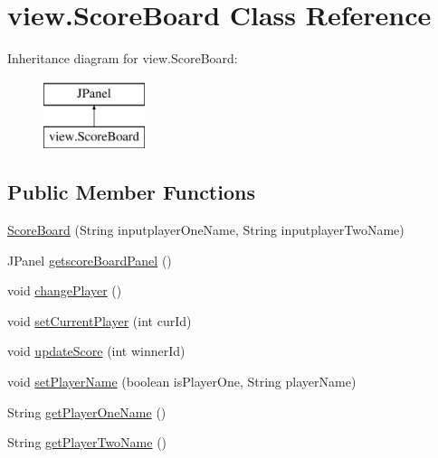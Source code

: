 \hypertarget{classview_1_1_score_board}{}\section{view.\+Score\+Board Class Reference}
\label{classview_1_1_score_board}
Inheritance diagram for view.\+Score\+Board\+:\begin{figure}[H]
\begin{center}
\leavevmode
\includegraphics[height=2.000000cm]{classview_1_1_score_board}
\end{center}
\end{figure}
\subsection*{Public Member Functions}
\begin{DoxyCompactItemize}
\item 
\mbox{\hyperlink{classview_1_1_score_board_ad9bcca8602465dc9c33b93053353a4fa}{Score\+Board}} (String inputplayer\+One\+Name, String inputplayer\+Two\+Name)
\item 
J\+Panel \mbox{\hyperlink{classview_1_1_score_board_a138c5f04adeea67eebffb3fa1bd8a555}{getscore\+Board\+Panel}} ()
\item 
void \mbox{\hyperlink{classview_1_1_score_board_a0a8523b0eb173040e140bbaa50c88a6c}{change\+Player}} ()
\item 
void \mbox{\hyperlink{classview_1_1_score_board_a2e37f0bda468fefb721e2619c736546f}{set\+Current\+Player}} (int cur\+Id)
\item 
void \mbox{\hyperlink{classview_1_1_score_board_ab2ce69c0f2a069520648b51dacb00949}{update\+Score}} (int winner\+Id)
\item 
void \mbox{\hyperlink{classview_1_1_score_board_a2868eabf0df3041317516ddf762c05f4}{set\+Player\+Name}} (boolean is\+Player\+One, String player\+Name)
\item 
String \mbox{\hyperlink{classview_1_1_score_board_a96e7115d4d1439b44a8c0b4c8a6f624d}{get\+Player\+One\+Name}} ()
\item 
String \mbox{\hyperlink{classview_1_1_score_board_a820ecd8c47da3e9eea8c191cef014819}{get\+Player\+Two\+Name}} ()
\end{DoxyCompactItemize}


